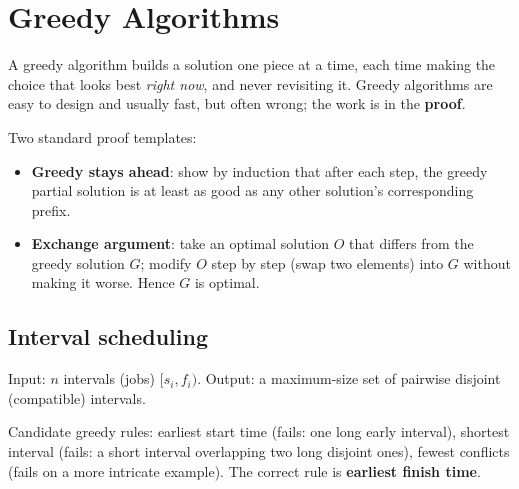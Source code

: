 \chapter{Greedy Algorithms}

\begin{important}[Paradigm]
A greedy algorithm builds a solution one piece at a time, each time making the choice that looks best
\emph{right now}, and never revisiting it. Greedy algorithms are easy to design and usually fast,
but often wrong; the work is in the \textbf{proof}.
\end{important}

Two standard proof templates:
\begin{itemize}
  \item \textbf{Greedy stays ahead}: show by induction that after each step, the greedy partial solution
        is at least as good as any other solution's corresponding prefix.
  \item \textbf{Exchange argument}: take an optimal solution $O$ that differs from the greedy solution $G$;
        modify $O$ step by step (swap two elements) into $G$ without making it worse. Hence $G$ is optimal.
\end{itemize}

\section{Interval scheduling}
\begin{definition}
Input: $n$ intervals (jobs) $[s_i,f_i)$. Output: a maximum-size set of pairwise disjoint (compatible) intervals.
\end{definition}

Candidate greedy rules: earliest start time (fails: one long early interval), shortest interval
(fails: a short interval overlapping two long disjoint ones), fewest conflicts (fails on a more intricate example).
The correct rule is \textbf{earliest finish time}.

